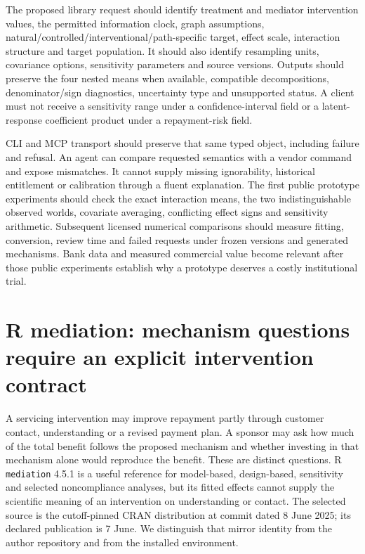 The proposed library request should identify treatment and mediator intervention values, the permitted information clock, graph assumptions, natural/controlled/interventional/path-specific target, effect scale, interaction structure and target population. It should also identify resampling units, covariance options, sensitivity parameters and source versions. Outputs should preserve the four nested means when available, compatible decompositions, denominator/sign diagnostics, uncertainty type and unsupported status. A client must not receive a sensitivity range under a confidence-interval field or a latent-response coefficient product under a repayment-risk field.

CLI and MCP transport should preserve that same typed object, including failure and refusal. An agent can compare requested semantics with a vendor command and expose mismatches. It cannot supply missing ignorability, historical entitlement or calibration through a fluent explanation. The first public prototype experiments should check the exact interaction means, the two indistinguishable observed worlds, covariate averaging, conflicting effect signs and sensitivity arithmetic. Subsequent licensed numerical comparisons should measure fitting, conversion, review time and failed requests under frozen versions and generated mechanisms. Bank data and measured commercial value become relevant after those public experiments establish why a prototype deserves a costly institutional trial.


\section{R mediation: mechanism questions require an explicit intervention contract}
\label{sec:exec24-mediation-reuse}

A servicing intervention may improve repayment partly through customer contact,
understanding or a revised payment plan. A sponsor may ask how much of the total
benefit follows the proposed mechanism and whether investing in that mechanism
alone would reproduce the benefit. These are distinct questions. R
\texttt{mediation} 4.5.1 is a useful reference for model-based, design-based,
sensitivity and selected noncompliance analyses, but its fitted effects cannot
supply the scientific meaning of an intervention on understanding or contact.
The selected source is the cutoff-pinned CRAN distribution at commit dated
8 June 2025; its declared publication is 7 June. We distinguish that mirror
identity from the author repository and from the installed environment.
\citep{exec24_mediation_sources}

